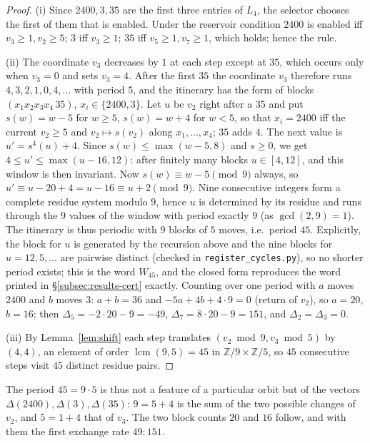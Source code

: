 \documentclass[11pt,a4paper]{article}
\theoremstyle{definition}
\newcommand{\Wa}{W_{45}}
\begin{document}
\begin{proof}
(i) Since $2400,3,35$ are the first three entries of $L_4$, the selector chooses the first of them that is enabled. Under the reservoir condition $2400$ is enabled iff $v_3\ge1,v_2\ge5$; $3$ iff $v_3\ge1$; $35$ iff $v_5\ge1,v_7\ge1$, which holds; hence the rule.

(ii) The coordinate $v_3$ decreases by $1$ at each step except at $35$, which occurs only when $v_3=0$ and sets $v_3=4$. After the first $35$ the coordinate $v_3$ therefore runs $4,3,2,1,0,4,\dots$ with period $5$, and the itinerary has the form of blocks $(x_1x_2x_3x_4\,35)$, $x_i\in\{2400,3\}$. Let $u$ be $v_2$ right after a $35$ and put $s(w)=w-5$ for $w\ge5$, $s(w)=w+4$ for $w<5$, so that $x_i=2400$ iff the current $v_2\ge5$ and $v_2\mapsto s(v_2)$ along $x_1,\dots,x_4$; $35$ adds $4$. The next value is $u'=s^4(u)+4$. Since $s(w)\le\max(w-5,8)$ and $s\ge0$, we get $4\le u'\le\max(u-16,12)$: after finitely many blocks $u\in[4,12]$, and this window is then invariant. Now $s(w)\equiv w-5\pmod 9$ always, so $u'\equiv u-20+4=u-16\equiv u+2\pmod9$. Nine consecutive integers form a complete residue system modulo $9$, hence $u$ is determined by its residue and runs through the $9$ values of the window with period exactly $9$ (as $\gcd(2,9)=1$). The itinerary is thus periodic with $9$ blocks of $5$ moves, i.e.\ period $45$. Explicitly, the block for $u$ is generated by the recursion above and the nine blocks for $u=12,5,\dots$ are pairwise distinct (checked in \texttt{register\_cycles.py}), so no shorter period exists; this is the word $\Wa$, and the closed form reproduces the word printed in \S\ref{subsec:results-cert} exactly. Counting over one period with $a$ moves $2400$ and $b$ moves $3$: $a+b=36$ and $-5a+4b+4\cdot9=0$ (return of $v_2$), so $a=20$, $b=16$; then $\Delta_5=-2\cdot20-9=-49$, $\Delta_7=8\cdot20-9=151$, and $\Delta_2=\Delta_3=0$.

(iii) By Lemma~\ref{lem:shift} each step translates $(v_2\bmod9,v_3\bmod5)$ by $(4,4)$, an element of order $\operatorname{lcm}(9,5)=45$ in $\mathbb{Z}/9\times\mathbb{Z}/5$, so $45$ consecutive steps visit $45$ distinct residue pairs.
\end{proof}

\noindent The period $45=9\cdot5$ is thus not a feature of a particular orbit but of the vectors $\Delta(2400),\Delta(3),\Delta(35)$: $9=5+4$ is the sum of the two possible changes of $v_2$, and $5=1+4$ that of $v_3$. The two block counts $20$ and $16$ follow, and with them the first exchange rate $49:151$.
\end{document}
